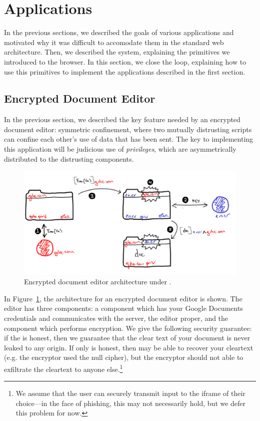 \section{Applications}

In the previous sections, we described the goals of various applications
and motivated why it was difficult to accomodate them in the standard
web architecture.  Then, we described the \sys{} system, explaining the
primitives we introduced to the browser.  In this section, we close the
loop, explaining how to use this primitives to implement the
applications described in the first section.

\subsection{Encrypted Document Editor}

In the previous section, we described the key feature needed by an
encrypted document editor: symmetric confinement, where two mutually
distrusting scripts can confine each other's use of data that has been
sent.  The key to implementing this application will be judicious use of
\emph{privileges}, which are asymmetrically distributed to the
distrusting components.

\begin{figure}
\centerline{\includegraphics[width=\columnwidth]{editor2-byhand}}
\caption{\label{fig:editor} Encrypted document editor architecture
under \sys{}.}
\end{figure}

In Figure~\ref{fig:editor}, the architecture for an encrypted document
editor is shown.  The editor has three components: a component which has
your Google Documents credentials and communicates with the server, the
editor proper, and the component which performs encryption.  We give the
following security guarantee: if the  is honest, then we
guarantee that the clear text of your document is never leaked to any
origin.  If only  is honest, then  may
be able to recover your cleartext (e.g. the encryptor used the null
cipher), but the encryptor should not able to exfiltrate the cleartext
to anyone else.\footnote{We assume that the user can securely transmit
input to the iframe of their choice---in the face of phishing, this may
not necessarily hold, but we defer this problem for now.}


